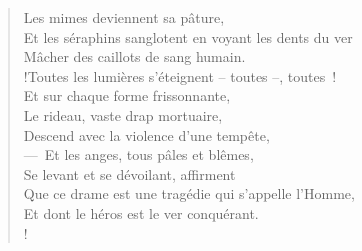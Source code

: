 \documentclass[french,twoside]{book} %
\begin{document}
\begin{verse}
Les mimes deviennent sa pâture,\\
Et les séraphins sanglotent en voyant les dents du ver\\
Mâcher des caillots de sang humain.\\!Toutes les lumières s’éteignent – toutes –, toutes !\\
Et sur chaque forme frissonnante,\\
Le rideau, vaste drap mortuaire,\\
Descend avec la violence d’une tempête,\\
— Et les anges, tous pâles et blêmes,\\
Se levant et se dévoilant, affirment\\
Que ce drame est une tragédie qui s’appelle l’Homme,\\
Et dont le héros est le ver conquérant.\\!
\end{verse}
\end{document}
